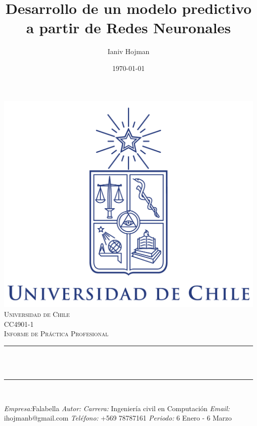 \documentclass[12pt]{article}
\title{Desarrollo de un modelo predictivo a partir de Redes Neuronales}					%
\author{Ianiv Hojman}					%
\date{\today}						%
\makeatletter
\let\thetitle\@title
\let\theauthor\@author
\let\thedate\@date
\makeatother
\begin{document}

\begin{titlepage}
	\centering
    \vspace*{0.0 cm}
    \includegraphics[scale = 0.13]{Logo_Uchile_modern.png}\\[1.0 cm]	%
    \textsc{\LARGE Universidad de Chile}\\[2.0 cm]	%
	\textsc{\Large CC4901-1}\\[0.5 cm]				%
	\textsc{\large Informe de Práctica Profesional}\\[0.5 cm]		%
	\rule{\linewidth}{0.2 mm} \\[0.4 cm]
	{ \huge \bfseries \thetitle}\\
	\rule{\linewidth}{0.2 mm} \\[0.5 cm]
	
	\begin{minipage}{1\textwidth}
		\begin{flushleft} \large
		\emph{Empresa:}Falabella\linebreak
		\emph{Autor:}\theauthor\linebreak
		\emph{Carrera:} Ingeniería civil en Computación\linebreak
		\emph{Email:} ihojmanb@gmail.com\linebreak
		\emph{Teléfono:} +569 78787161\linebreak
		\emph{Periodo:} 6 Enero - 6 Marzo
		\end{flushleft}
	\end{minipage}\\[1 cm]
	
	{\large \thedate}\\[2 cm]
 
	\vfill
	
\end{titlepage}
\end{document}
